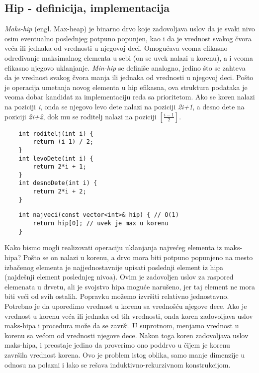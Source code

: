 \documentclass{article}
\begin{document}
\subsection{Hip - definicija, implementacija}
\textit{Maks-hip} (engl. Max-heap) je binarno drvo koje zadovoljava uslov da je svaki
nivo osim eventualno poslednjeg potpuno popunjen, kao i da je vrednost svakog
čvora veća ili jednaka od vrednosti u njegovoj deci. Omogućava veoma efikasno određivanje maksimalnog
elementa u sebi (on se uvek nalazi u korenu), a i veoma efikasno
njegovo uklanjanje. 
\newline \textit{Min-hip} se definiše analogno,
jedino što se zahteva da je vrednost svakog čvora manja ili jednaka od vrednosti
u njegovoj deci.
\newline Pošto je operacija umetanja novog elementa u hip efikasna,
ova struktura podataka je veoma dobar kandidat za implementaciju reda sa
prioritetom. Ako se koren nalazi na poziciji \textit{i}, onda se njegovo levo dete
nalazi na poziciji \textit{2i+1}, a desno dete na poziciji \textit{2i+2}, dok mu se roditelj nalazi
na poziciji $[\frac{i-1}{2}]$.
\begin{lstlisting}
    int roditelj(int i) {
        return (i-1) / 2;
    }
    int levoDete(int i) {
        return 2*i + 1;
    }
    int desnoDete(int i) {
        return 2*i + 2;
    }
\end{lstlisting}
\begin{lstlisting}
    int najveci(const vector<int>& hip) { // O(1)
        return hip[0]; // uvek je max u korenu
    }
\end{lstlisting}
Kako bismo mogli realizovati operaciju uklanjanja najvećeg elementa iz maks-hipa? Pošto se on nalazi u korenu, a drvo mora biti potpuno
popunjeno na mesto izbačenog elementa je
najjednostavnije upisati poslednji element iz hipa (najdešnji element poslednjeg
nivoa). Ovim je zadovoljen uslov za raspored elemenata u drvetu, ali je svojstvo
hipa moguće narušeno, jer taj element ne mora biti veći od svih ostalih. Popravku možemo izvršiti relativno jednostavno. Potrebno je
da uporedimo vrednost u korenu sa vrednošću njegove dece. Ako
je vrednost u korenu veća ili jednaka od tih vrednosti, onda koren zadovoljava
uslov maks-hipa i procedura može da se završi. U
suprotnom, menjamo vrednost u korenu sa većom od vrednosti njegove dece. Nakon toga
koren zadovoljava uslov maks-hipa, i preostaje jedino da proverimo  ono poddrvo u čijem je korenu završila vrednost korena. Ovo je
problem istog oblika, samo manje dimenzije u odnosu na polazni i lako se rešava induktivno-rekurzivnom konstrukcijom.
\end{document}
